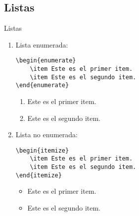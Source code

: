 \documentclass[../slides.tex]{subfiles}
\begin{document}
    \subsection{Listas}
    \begin{frame}[fragile]{Listas}
        \begin{enumerate}
            \item Lista enumerada:
                \begin{verbatim}
\begin{enumerate}
    \item Este es el primer item.
    \item Este es el segundo item.
\end{enumerate}
                \end{verbatim}
\begin{enumerate}
    \item Este es el primer item.
    \item Este es el segundo item.
\end{enumerate}
            \item Lista no enumerada:
                \begin{verbatim}
\begin{itemize}
    \item Este es el primer item.
    \item Este es el segundo item.
\end{itemize}
                \end{verbatim}
\begin{itemize}
    \item Este es el primer item.
    \item Este es el segundo item.
\end{itemize}
        \end{enumerate}
    \end{frame}
    
\end{document}
